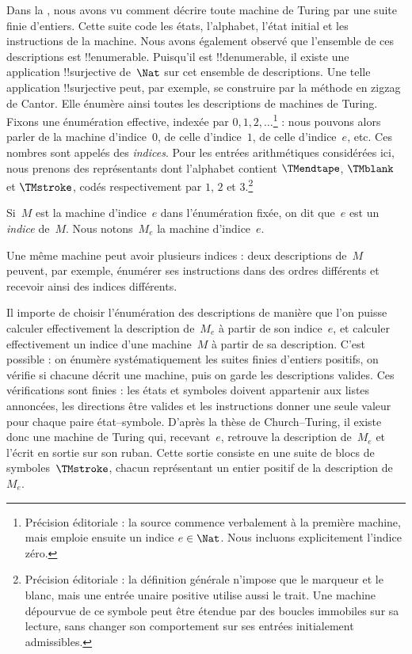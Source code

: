 \documentclass[../../../include/open-logic-section]{subfiles}
\begin{document}

Dans la , nous avons vu comment décrire toute machine
de Turing par une suite finie d'entiers. Cette suite code les états,
l'alphabet, l'état initial et les instructions de la machine. Nous
avons également observé que l'ensemble de ces descriptions est
!!{enumerable}. Puisqu'il est !!{denumerable}, il existe
une application !!{surjective} de~$\Nat$ sur cet ensemble de
descriptions. Une telle application !!{surjective} peut, par
exemple, se construire par la méthode en zigzag de Cantor. Elle
énumère ainsi toutes les descriptions
de machines de Turing. Fixons une énumération effective, indexée
par $0,1,2,\dots$\footnote{Précision éditoriale : la source commence verbalement à la première machine, mais emploie ensuite un indice $e\in\Nat$. Nous incluons explicitement l'indice zéro.} : nous pouvons alors parler de la machine
d'indice~$0$, de celle d'indice~$1$, de celle d'indice~$e$, etc.
Ces nombres sont appelés des \emph{indices}. Pour les entrées arithmétiques considérées ici, nous prenons des représentants dont l'alphabet contient $\TMendtape$, $\TMblank$ et $\TMstroke$, codés respectivement par $1$, $2$ et $3$.\footnote{Précision éditoriale : la définition générale n'impose que le marqueur et le blanc, mais une entrée unaire positive utilise aussi le trait. Une machine dépourvue de ce symbole peut être étendue par des boucles immobiles sur sa lecture, sans changer son comportement sur ses entrées initialement admissibles.}

\begin{defn}
Si~$M$ est la machine d'indice~$e$ dans l'énumération fixée,
on dit que~$e$ est un \emph{indice} de~$M$. Nous notons~$M_e$
la machine d'indice~$e$.
\end{defn}

Une même machine peut avoir plusieurs indices : deux descriptions
de~$M$ peuvent, par exemple, énumérer ses instructions dans des
ordres différents et recevoir ainsi des indices différents.

Il importe de choisir l'énumération des descriptions de manière
que l'on puisse calculer effectivement la description de~$M_e$
à partir de son indice~$e$, et calculer effectivement un indice
d'une machine~$M$ à partir de sa description. C'est possible : on énumère systématiquement les suites finies d'entiers positifs, on vérifie si chacune décrit une machine, puis on garde les descriptions valides. Ces vérifications sont finies : les états et symboles doivent appartenir aux listes annoncées, les directions être valides et les instructions donner une seule valeur pour chaque paire état--symbole.
D'après la thèse de Church--Turing, il existe donc une machine
de Turing qui, recevant~$e$, retrouve la description de~$M_e$
et l'écrit en sortie sur son ruban. Cette sortie consiste en une
suite de blocs de symboles~$\TMstroke$, chacun représentant un
entier positif de la description de~$M_e$.
\end{document}
